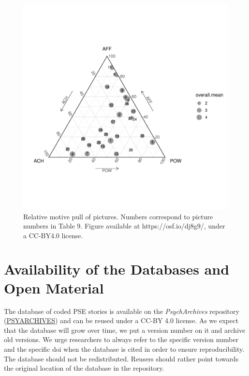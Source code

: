 \documentclass[man,a4paper,mask]{apa6}\usepackage[]{graphicx}\usepackage[]{color}
\newenvironment{knitrout}{}{} %
\begin{document}
\begin{knitrout}
\color{fgcolor}\begin{figure}

{\centering \includegraphics[width=.9\textwidth]{figure/ternary-1} 

}

\caption[Relative motive pull of pictures]{Relative motive pull of pictures. Numbers correspond to picture numbers in Table 9. Figure available at https://osf.io/dj8g9/, under a CC-BY4.0 license.}\label{fig:ternary}
\end{figure}


\end{knitrout}

\section{Availability of the Databases and Open Material}

The database of coded PSE stories is available on the \emph{PsychArchives} repository (\url{PSYARCHIVES}) and can be reused under a CC-BY 4.0 license. As we expect that the database will grow over time, we put a version number on it and archive old versions. We urge researchers to always refer to the specific version number and the specific doi when the database is cited in order to ensure reproducibility. The database should not be redistributed. Reusers should rather point towards the original location of the database in the repository.
\end{document}
